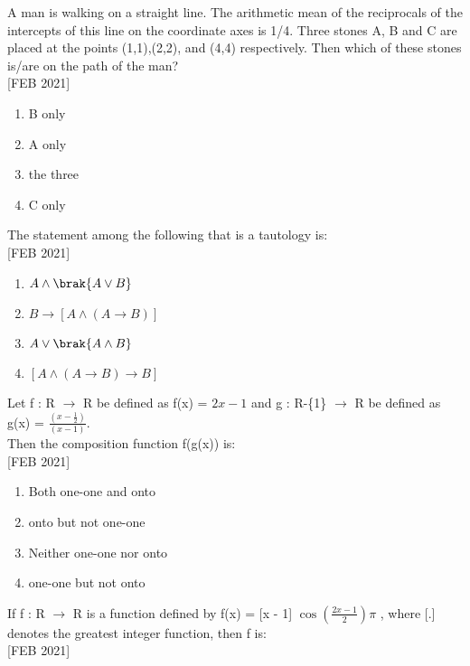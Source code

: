     \item A man is walking on a straight line. The arithmetic mean of the reciprocals of the intercepts of this line on the coordinate axes is 1/4. Three stones A, B and C are placed at the points (1,1),(2,2), and (4,4) respectively. Then which of these stones is/are on the path of the man? \\\hfill{[FEB 2021]}
     \begin{multicols}{4}
    \begin{enumerate}
        \item B only 
        \item A only
        \item the three
        \item C only
    \end{enumerate} 
    \end{multicols}
    \item The statement among the following that is a tautology is: \\\hfill{[FEB 2021]}
    \begin{enumerate}
        \item $A \land \brak{A \lor B}$
        \item $B \rightarrow [A \land (A \rightarrow B)]$
        \item $A \lor \brak{A \land B}$
        \item $[A \land (A \rightarrow B) \rightarrow B]$
    \end{enumerate}
    \item Let f : R $\rightarrow$ R be defined as f(x) = $2x-1$ and g : R-\{1\} $\rightarrow$ R be defined as \\ g(x) = $\frac{(x-\frac{1}{2})}{(x-1)}$.\\Then the composition function f(g(x)) is: \\\hfill{[FEB 2021]}
    \begin{enumerate}
        \item Both one-one and onto
        \item onto but not one-one
        \item Neither one-one nor onto
        \item one-one but not onto
    \end{enumerate}
    \item If f : R $\rightarrow$ R is a function defined by f(x) = [x - 1] $\cos{(\frac{2x - 1}{2})\pi}$ , where [.] denotes the greatest integer function, then f is: \\\hfill{[FEB 2021]}
